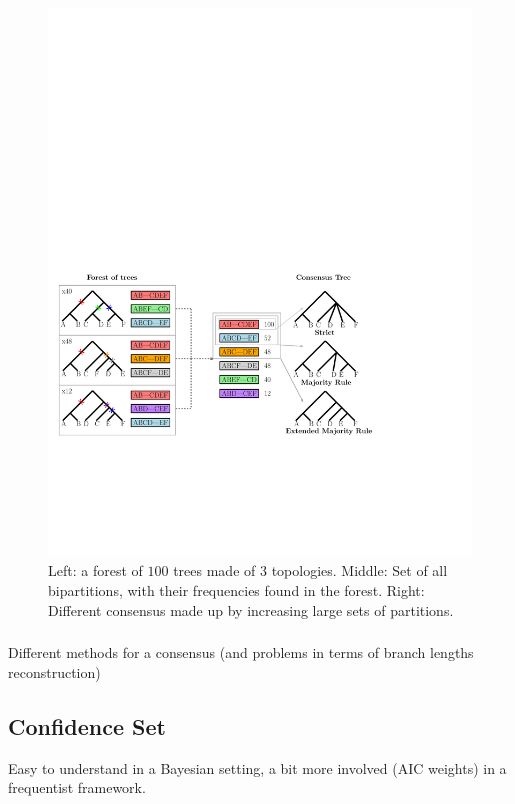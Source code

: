 \begin{figure}
 \includegraphics[width=0.9\linewidth]{Figs/consensus}
 \caption{Left: a forest of $100$ trees made of $3$ topologies. Middle: Set of all bipartitions, with their frequencies found in the forest. Right: Different consensus made up by increasing large sets of partitions.}
 \label{fig:consensus}
\end{figure}

\subsubsection{}



Different methods for a consensus (and problems in terms of branch lengths reconstruction)

\subsection{Confidence Set} \label{sec:confidence-sets}

Easy to understand in a Bayesian setting, a bit more involved (AIC weights) in a frequentist framework. 

